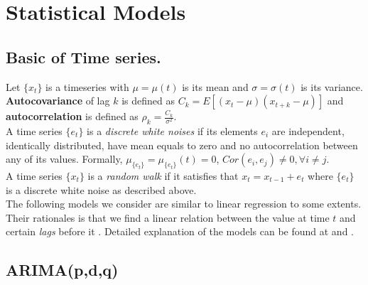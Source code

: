 \documentclass[11pt]{article}
\begin{document}
\section{Statistical Models}
\subsection{Basic of Time series.}
Let $\{x_t\}$ is a timeseries with $\mu=\mu(t)$ is its mean and
$\sigma=\sigma(t)$ is its variance. \textbf{Autocovariance} of lag $k$ is
defined as $C_k=E[(x_t-\mu)(x_{t+k}-\mu)]$ and \textbf{autocorrelation} is
defined
as $\rho_k=\frac{C_k}{\sigma^2}$.\\
A time series $\{e_t\}$ is a \textit{discrete white noises} if its elements
$e_i$ are independent, identically distributed, have mean equals to zero and no
autocorrelation between any of its values. Formally,
$\mu_{\{e_t\}}=\mu_{\{e_t\}}(t)=0$,
$Cor(e_i,e_j)\neq 0, \forall i \neq j$.\\
A time series $\{x_t\}$ is a \textit{random walk} if it satisfies that
$x_t=x_{t-1}+e_t$ where $\{e_t\}$ is a discrete white noise as described above.\\
The following models we consider are similar to linear regression to some
extents. Their rationales is that we find a linear relation between the
value at time $t$ and certain \textit{lags} before it . Detailed explanation of
the models can be found at \cite{GVK483463442} and \cite{quantstart}.

\subsection{ARIMA(p,d,q)}
\end{document}
